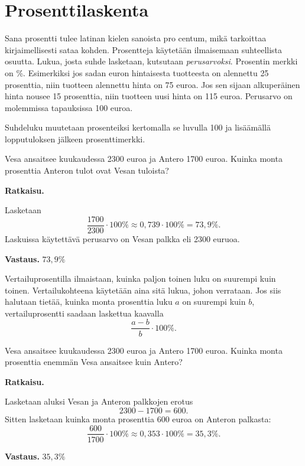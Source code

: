 \chapter{Prosenttilaskenta}

Sana prosentti tulee latinan kielen sanoista pro centum, mikä tarkoittaa
kirjaimellisesti sataa kohden. Prosentteja käytetään ilmaisemaan suhteellista
osuutta. Lukua, josta suhde lasketaan, kutsutaan \emph{perusarvoksi}. Prosentin
merkki on \%. Esimerkiksi jos sadan euron hintaisesta tuotteesta on alennettu 25
prosenttia, niin tuotteen alennettu hinta on 75 euroa. Jos sen sijaan alkuperäinen
hinta nousee 15 prosenttia, niin tuotteen uusi hinta on 115 euroa. Perusarvo on
molemmissa tapauksissa 100 euroa.



Suhdeluku muutetaan prosenteiksi kertomalla se luvulla 100 ja lisäämällä
lopputuloksen jälkeen prosenttimerkki.

\begin{esimerkki}
Vesa ansaitsee kuukaudessa 2300 euroa ja Antero 1700 euroa.
    Kuinka monta prosenttia Anteron tulot ovat Vesan tuloista? 
    
    {\bf Ratkaisu.}
    
    Lasketaan
    \[
    \frac{1700}{2300} \cdot 100 \% \approx 0,739\cdot 100 \% = 73,9 \%.
    \]
    Laskuissa käytettävä perusarvo on Vesan palkka eli 2300 euruoa.
    
    {\bf Vastaus.}
     $73,9 \%$
\end{esimerkki}


Vertailuprosentilla ilmaistaan, kuinka paljon toinen luku on suurempi kuin toinen. Vertailukohteena käytetään aina sitä lukua, johon verrataan. Jos siis halutaan tietää, kuinka monta prosenttia luku $a$ on suurempi kuin $b$, vertailuprosentti saadaan laskettua kaavalla
\[
\frac{a-b}{b} \cdot 100 \%.
\]

\begin{esimerkki}
    Vesa ansaitsee kuukaudessa 2300 euroa ja Antero 1700 euroa.
    Kuinka monta prosenttia enemmän Vesa ansaitsee kuin Antero?
    
    {\bf Ratkaisu.}
    
    Lasketaan aluksi Vesan ja Anteron palkkojen erotus
    \[
    2300-1700 = 600.
    \]
    Sitten lasketaan kuinka monta prosenttia 600 euroa on Anteron palkasta:
    \[
    \frac{600}{1700} \cdot 100 \% \approx 0,353\cdot 100\% = 35,3 \%.
    \]
    
    {\bf Vastaus.}
    $35,3 \%$
\end{esimerkki}

